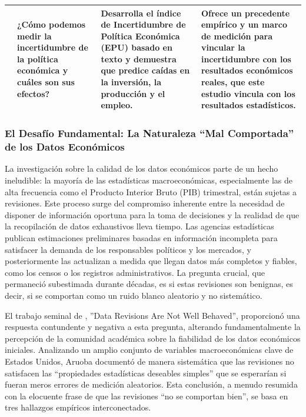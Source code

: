 \documentclass{article}
\begin{document}
\begin{table}[h!]
\begin{tabularx}{\textwidth}{|l|X|X|X|}
        \hline
        \citet{baker2016} & ¿Cómo podemos medir la incertidumbre de la política económica y cuáles son sus efectos? & Desarrolla el índice de Incertidumbre de Política Económica (EPU) basado en texto y demuestra que predice caídas en la inversión, la producción y el empleo. & Ofrece un precedente empírico y un marco de medición para vincular la incertidumbre con los resultados económicos reales, que este estudio vincula con los resultados estadísticos. \\
        \hline
    \end{tabularx}
\end{table}

\subsubsection{El Desafío Fundamental: La Naturaleza ``Mal Comportada'' de los Datos Económicos}

La investigación sobre la calidad de los datos económicos parte de un hecho ineludible: la mayoría de las estadísticas macroeconómicas, especialmente las de alta frecuencia como el Producto Interior Bruto (PIB) trimestral, están sujetas a revisiones. Este proceso surge del compromiso inherente entre la necesidad de disponer de información oportuna para la toma de decisiones y la realidad de que la recopilación de datos exhaustivos lleva tiempo. Las agencias estadísticas publican estimaciones preliminares basadas en información incompleta para satisfacer la demanda de los responsables políticos y los mercados, y posteriormente las actualizan a medida que llegan datos más completos y fiables, como los censos o los registros administrativos. La pregunta crucial, que permaneció subestimada durante décadas, es si estas revisiones son benignas, es decir, si se comportan como un ruido blanco aleatorio y no sistemático.

El trabajo seminal de \citet{aruoba2008}, ''Data Revisions Are Not Well Behaved'', proporcionó una respuesta contundente y negativa a esta pregunta, alterando fundamentalmente la percepción de la comunidad académica sobre la fiabilidad de los datos económicos iniciales. Analizando un amplio conjunto de variables macroeconómicas clave de Estados Unidos, Aruoba documentó de manera sistemática que las revisiones no satisfacen las ``propiedades estadísticas deseables simples'' que se esperarían si fueran meros errores de medición aleatorios. Esta conclusión, a menudo resumida con la elocuente frase de que las revisiones ``no se comportan bien'', se basa en tres hallazgos empíricos interconectados.
\end{document}
